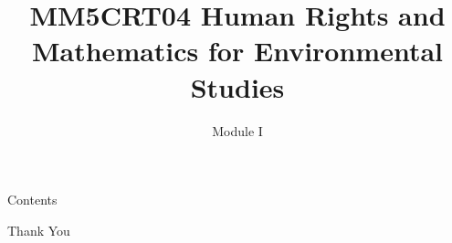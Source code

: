 \documentclass{beamer}
\title{MM5CRT04 Human Rights and Mathematics for Environmental Studies}
\author{Module I}
\institute{}
\begin{document}
\begin{frame}
\maketitle
\end{frame}

\begin{frame}{Contents}
\tableofcontents
\end{frame}

\begin{frame}
	\vspace{0.6in}
	\hspace{3cm} {\color{blue}\Huge{Thank You}}
\end{frame}
\end{document}
